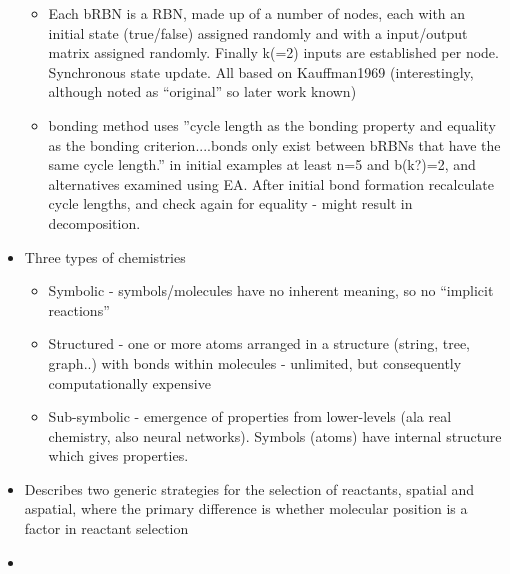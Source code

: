 \begin{itemize}
\begin{itemize}
				\item
				
				Each bRBN is a RBN, made up of a number of nodes, each with an
				initial state (true/false) assigned randomly and with a input/output
				matrix assigned randomly. Finally k(=2) inputs are established per
				node. Synchronous state update. All based on Kauffman1969
				(interestingly, although noted as ``original'' so later work known)
				
				\item
				
				bonding method uses ''cycle length as the bonding property and
				equality as the bonding criterion....bonds only exist between bRBNs
				that have the same cycle length.'' in initial examples at least n=5
				and b(k?)=2, and alternatives examined using EA. After initial bond
				formation recalculate cycle lengths, and check again for equality -
				might result in decomposition.
				
			\end{itemize}
			\item
			
			Three types of chemistries
			
			
			\begin{itemize}
				\item
				
				Symbolic - symbols/molecules have no inherent meaning, so no
				``implicit reactions''
				
				\item
				
				Structured - one or more atoms arranged in a structure (string,
				tree, graph..) with bonds within molecules - unlimited, but
				consequently computationally expensive
				
				\item
				
				Sub-symbolic - emergence of properties from lower-levels (ala real
				chemistry, also neural networks). Symbols (atoms) have internal
				structure which gives properties.
				
			\end{itemize}
			\item
			
			Describes two generic strategies for the selection of reactants,
			spatial and aspatial, where the primary difference is whether
			molecular position is a factor in reactant selection
			
			\item
			

\end{itemize}
